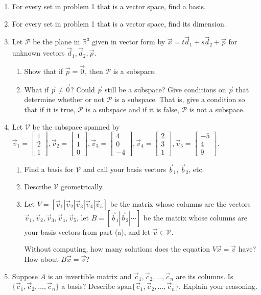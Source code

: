 \documentclass[letter]{article}
\newcommand{\R}{\mathbb{R}}
\newcommand{\Span}{\mathrm{span}}
\newcommand{\mat}[1]{\begin{bmatrix}#1\end{bmatrix}}
\begin{document}
\begin{enumerate}
		\item For every set in problem 1 that is a vector space, find a basis.
		\item For every set in problem 1 that is a vector space, find its dimension.

		\item Let $\mathcal P$ be the plane in $\R^3$ given in vector form by
			$\vec x=t\vec d_1+s\vec d_2+\vec p$ for unknown vectors $\vec d_1,\vec d_2,\vec p$.
			\begin{enumerate}
				\item Show that if $\vec p=\vec 0$, then $\mathcal P$ is a subspace.
				\item What if $\vec p\neq \vec 0$?  Could $\vec p$ still be a subspace?  Give
					conditions on $\vec p$ that determine whether or not $\mathcal P$
					is a subspace.  That is, give a condition so that if it is true, $\mathcal P$
					is a subspace and if it is false, $\mathcal P$ is not a subspace.
			\end{enumerate}
		\item Let $\mathcal V$ be the subspace spanned by $\vec v_1=\mat{1\\2\\1},\vec v_2=\mat{1\\1\\0},\vec v_3=\mat{4\\0\\-4},
			\vec v_4=\mat{2\\3\\1},\vec v_5=\mat{-5\\4\\9}$.
			\begin{enumerate}
				\item Find a basis for $\mathcal V$ and call your basis vectors $\vec b_1$, $\vec b_2$, etc.
				\item Describe $\mathcal V$ geometrically.
				\item Let $V=[\vec v_1|\vec v_2|\vec v_3|\vec v_4|\vec v_5]$ be the matrix whose columns are the vectors
					$\vec v_1,\vec v_2,\vec v_3,\vec v_4,\vec v_5$, let $B=[\vec b_1|\vec b_2|\cdots]$ be the matrix
					whose columns are your basis vectors from part (a), and let $\vec v\in \mathcal V$.

					Without computing, how many solutions does the equation $V\vec x=\vec v$ have?  How
					about $B\vec x=\vec v$?
			\end{enumerate}
		\item Suppose $A$ is an invertible matrix and $\vec c_1,\vec c_2,\ldots,\vec c_n$ are its columns.  Is
			$\{\vec c_1,\vec c_2,\ldots, \vec c_n\}$ a basis?  Describe $\Span\{\vec c_1,\vec c_2,\ldots, \vec c_n\}$.  Explain
			your reasoning.

	\end{enumerate}
\end{document}
